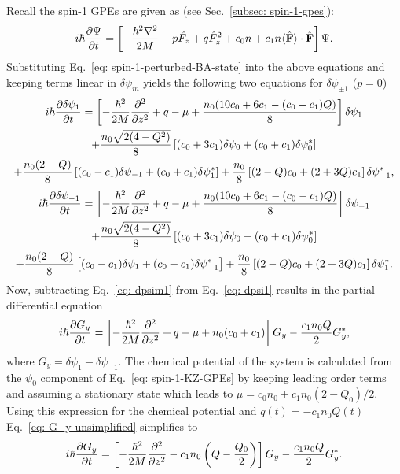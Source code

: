 Recall the spin-1 GPEs are given as (see Sec.~\ref{subsec: spin-1-gpes}):
\begin{align}\label{eq: spin-1-KZ-GPEs}
    i\hbar\pdv{\Psi}{t} = \left[ -\frac{\hbar^2\nabla^2}{2M}
    -p\hat{F_z} + q\hat{F}_z^2 +c_0n +c_1n\langle \hat{\vb{F}}\rangle
    \cdot \hat{\vb{F}}\right]\Psi.
\end{align}
Substituting Eq.~\eqref{eq: spin-1-perturbed-BA-state} into the above equations
and keeping terms linear in \(\delta\psi_m\) yields the following two
equations for \(\delta\psi_{\pm 1}\) (\(p=0\))
\begin{multline}\label{eq: dpsi1}
    i\hbar\pdv{\delta\psi_1}{t} = \left[-\frac{\hbar^2}{2M}\pdv[2]{}{z}+q-\mu
    + \frac{n_0(10c_0+6c_1-(c_0-c_1)Q)}{8}\right]\delta\psi_1 \\
    + \frac{n_0\sqrt{2(4-Q^2)}}{8}\left[
        (c_0 + 3c_1)\delta\psi_0
        + (c_0+c_1)\delta\psi_0^*
    \right] \\
    + \frac{n_0(2-Q)}{8}\left[(c_0-c_1)\delta\psi_{-1}
    + (c_0+c_1)\delta\psi_1^*\right]
    + \frac{n_0}{8}\left[(2-Q)c_0 + (2+3Q)c_1\right]\delta\psi_{-1}^*,
\end{multline}
\begin{multline}\label{eq: dpsim1}
    i\hbar\pdv{\delta\psi_{-1}}{t} = \left[-\frac{\hbar^2}{2M}\pdv[2]{}{z}+q-\mu
    + \frac{n_0(10c_0+6c_1-(c_0-c_1)Q)}{8}\right]\delta\psi_{-1} \\
    + \frac{n_0\sqrt{2(4-Q^2)}}{8}\left[
        (c_0 + 3c_1)\delta\psi_0
        + (c_0+c_1)\delta\psi_0^*
    \right] \\
    + \frac{n_0(2-Q)}{8}\left[(c_0-c_1)\delta\psi_{1}
    + (c_0+c_1)\delta\psi_{-1}^*\right]
    + \frac{n_0}{8}\left[(2-Q)c_0 + (2+3Q)c_1\right]\delta\psi_{1}^*.
\end{multline}
Now, subtracting Eq.~\eqref{eq: dpsim1} from Eq.~\eqref{eq: dpsi1} results in
the partial differential equation
\begin{align}\label{eq: G_y-unsimplified}
    i\hbar\pdv{G_y}{t}= \left[ -\frac{\hbar^2}{2M}\pdv[2]{}{z}+q
    -\mu+n_0(c_0+c_1)\right]G_y
    -\frac{c_1n_0Q}{2}G_y^*,
\end{align}
where \(G_y = \delta\psi_1 - \delta\psi_{-1}\).
The chemical potential of the system is calculated from the \(\psi_0\)
component of Eq.~\eqref{eq: spin-1-KZ-GPEs} by keeping leading order terms and
assuming a stationary state which leads to
\(\mu=c_0n_0 + c_1n_0(2 - Q_0)/2\).
Using this expression for the chemical potential and \(q(t) = -c_1n_0Q(t)\)
Eq.~\eqref{eq: G_y-unsimplified} simplifies to
\begin{align}\label{eq: G_y-simplified}
    i\hbar\pdv{G_y}{t} = \left[ -\frac{\hbar^2}{2M}\pdv[2]{}{z}
    -c_1n_0\left(Q-\frac{Q_0}{2}\right)\right]G_y
    - \frac{c_1n_0Q}{2}G_y^*.
\end{align}

